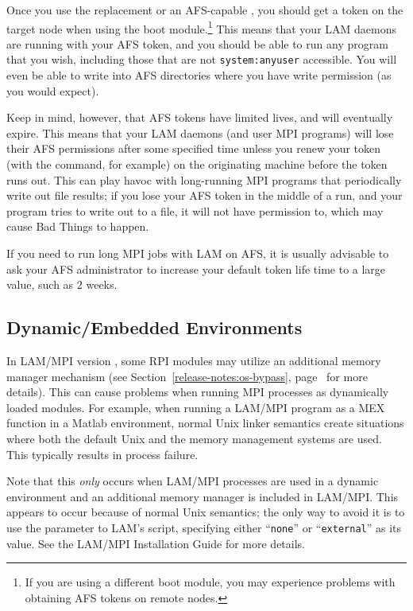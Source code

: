Once you use the replacement  or an AFS-capable ,
you should get a token on the target node when using the 
boot module.\footnote{If you are using a different boot module, you
  may experience problems with obtaining AFS tokens on remote nodes.}
This means that your LAM daemons are running with your AFS token, and
you should be able to run any program that you wish, including those
that are not {\tt system:anyuser} accessible.  You will even be able
to write into AFS directories where you have write permission (as you
would expect).

Keep in mind, however, that AFS tokens have limited lives, and will
eventually expire.  This means that your LAM daemons (and user MPI
programs) will lose their AFS permissions after some specified time
unless you renew your token (with the  command, for example)
on the originating machine before the token runs out.  This can play
havoc with long-running MPI programs that periodically write out file
results; if you lose your AFS token in the middle of a run, and your
program tries to write out to a file, it will not have permission to,
which may cause Bad Things to happen.

If you need to run long MPI jobs with LAM on AFS, it is usually
advisable to ask your AFS administrator to increase your default token
life time to a large value, such as 2 weeks.


\subsection{Dynamic/Embedded Environments}

%
In LAM/MPI version \lamversion, some RPI modules may utilize an
additional memory manager mechanism (see
Section~\ref{release-notes:os-bypass},
page~\pageref{release-notes:os-bypass} for more details).  This can
cause problems when running MPI processes as dynamically loaded
modules.
%
For example, when running a LAM/MPI program as a MEX function in a
Matlab environment, normal Unix linker semantics create situations
where both the default Unix and the memory management systems are
used.  This typically results in process failure.

Note that this {\em only} occurs when LAM/MPI processes are used in a
dynamic environment and an additional memory manager is included in
LAM/MPI.  This appears to occur because of normal Unix semantics;
the only way to avoid it is to use the
 parameter to LAM's 
script, specifying either ``{\tt none}'' or ``{\tt external}'' as its
value.  See the LAM/MPI Installation Guide for more details.

